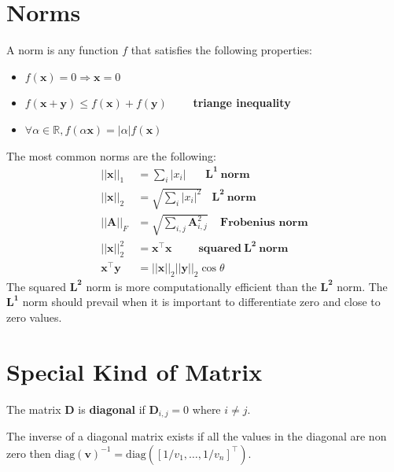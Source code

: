 \documentclass[12pt]{report}
\begin{document}
    \section{Norms}
    A norm is any function $f$ that satisfies the following properties:
    \begin{itemize}
        \item $f(\boldsymbol{x}) = 0 \Rightarrow \boldsymbol{x} = 0$
        \item $f(\boldsymbol{x} + \boldsymbol{y}) \leq f(\boldsymbol{x}) + f(\boldsymbol{y})$~~~~ \textbf{triange inequality}
        \item $\forall \alpha \in \mathbb{R},
        f(\alpha\boldsymbol{x}) = |\alpha|f(\boldsymbol{x})$
    \end{itemize}
    
    The most common norms are the following:
    \begin{align}
        ||\boldsymbol{x}||_1 &= \sum_i{|x_i|}~~~~~~~~
        \boldsymbol{L}^{\boldsymbol{1}}~\textbf{norm}\\[8pt]
        ||\boldsymbol{x}||_2 &= \sqrt{\sum_i{|x_i|^2}}~~~~ 
        \boldsymbol{L}^{\boldsymbol{2}}~\textbf{norm}\\[8pt]
        ||\boldsymbol{A}||_F &= \sqrt{\sum_{i,j}{\boldsymbol{A}_{i,j}^2}}~~~~~\textbf{Frobenius norm}\\[8pt]
        ||\boldsymbol{x}||_2^2 &= \boldsymbol{x}^\top \boldsymbol{x}~~~~~~~~~~~\textbf{squared}~ \boldsymbol{L}^{\boldsymbol{2}}~\textbf{norm}\\[8pt]
        \boldsymbol{x}^\top \boldsymbol{y} &= ||\boldsymbol{x}||_2 ||\boldsymbol{y}||_2 \cos\theta
    \end{align}
    The squared $\boldsymbol{L^2}$ norm is more computationally efficient than the $\boldsymbol{L^2}$ norm. The $\boldsymbol{L^1}$ norm should prevail when it is important to differentiate zero and close to zero values.
    
    \section{Special Kind of Matrix}
        The matrix $\boldsymbol{D}$ is \textbf{diagonal} if $\boldsymbol{D}_{i,j} = 0$ where $i \neq j$.
        
        The inverse of a diagonal matrix exists if all the values in the diagonal are non zero then $\text{diag}(\boldsymbol{v})^{-1} = \text{diag}([1/v_1, \dots, 1/v_n]^\top)$.
        
\end{document}
